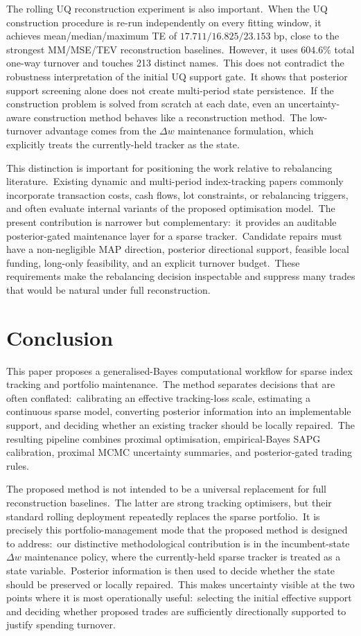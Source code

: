 \documentclass[11pt]{article}
\begin{document}
The rolling UQ reconstruction experiment is also important.\ When the UQ construction procedure is re-run independently on every fitting window, it achieves mean/median/maximum TE of $17.711/16.825/23.153$ bp, close to the strongest MM/MSE/TEV reconstruction baselines.\ However, it uses $604.6\%$ total one-way turnover and touches 213 distinct names.\ This does not contradict the robustness interpretation of the initial UQ support gate.\ It shows that posterior support screening alone does not create multi-period state persistence.\ If the construction problem is solved from scratch at each date, even an uncertainty-aware construction method behaves like a reconstruction method.\ The low-turnover advantage comes from the $\Delta w$ maintenance formulation, which explicitly treats the currently-held tracker as the state.

This distinction is important for positioning the work relative to rebalancing literature.\  Existing dynamic and multi-period index-tracking papers commonly incorporate transaction costs, cash flows, lot constraints, or rebalancing triggers, and often evaluate internal variants of the proposed optimisation model.\ The present contribution is narrower but complementary:\ it provides an auditable posterior-gated maintenance layer for a sparse tracker.\ Candidate repairs must have a non-negligible MAP direction, posterior directional support, feasible local funding, long-only feasibility, and an explicit turnover budget.\ These requirements make the rebalancing decision inspectable and suppress many trades that would be natural under full reconstruction.


\section{Conclusion}

This paper proposes a generalised-Bayes computational workflow for sparse index tracking and portfolio maintenance.\ The method separates decisions that are often conflated:\ calibrating an effective tracking-loss scale, estimating a continuous sparse model, converting posterior information into an implementable support, and deciding whether an existing tracker should be locally repaired.\ The resulting pipeline combines proximal optimisation, empirical-Bayes SAPG calibration, proximal MCMC uncertainty summaries, and posterior-gated trading rules.

The proposed method is not intended to be a universal replacement for full reconstruction baselines.\ The latter are strong tracking optimisers, but their standard rolling deployment repeatedly replaces the sparse portfolio.\ It is precisely this portfolio-management mode that the proposed method is designed to address:\ our distinctive methodological contribution is in the incumbent-state $\Delta w$ maintenance policy, where the currently-held sparse tracker is treated as a state variable.\ Posterior information is then used to decide whether the state should be preserved or locally repaired.\ This makes uncertainty visible at the two points where it is most operationally useful:\ selecting the initial effective support and deciding whether proposed trades are sufficiently directionally supported to justify spending turnover.
 
\end{document}
